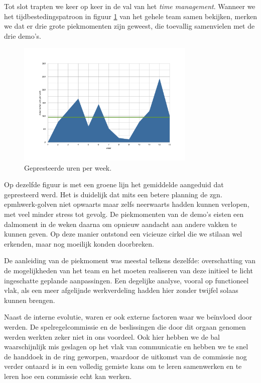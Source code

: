 \documentclass[12pt,a4paper]{report}
\begin{document}
Tot slot trapten we keer op keer in de val van het \emph{time management}. Wanneer we het tijdbestedingspatroon in figuur \ref{fig:effort} van het gehele team samen bekijken, merken we dat er drie grote piekmomenten zijn geweest, die toevallig samenvielen met de drie demo's. 

\begin{figure}[htbp]
  \centering
  \includegraphics[width=85mm]{resources/effort.pdf}
  \caption{Gepresteerde uren per week.}
  \label{fig:effort}
\end{figure}

Op dezelfde figuur is met een groene lijn het gemiddelde aangeduid dat gepresteerd werd. Het is duidelijk dat mits een betere planning de zgn.\\epmh{werk-golven} niet opwaarts maar zelfs neerwaarts hadden kunnen verlopen, met veel minder stress tot gevolg. De piekmomenten van de demo's eisten een dalmoment in de weken daarna om opnieuw aandacht aan andere vakken te kunnen geven. Op deze manier ontstond een vicieuze cirkel die we stilaan wel erkenden, maar nog moeilijk konden doorbreken.

De aanleiding van de piekmoment was meestal telkens dezelfde: overschatting van de mogelijkheden van het team en het moeten realiseren van deze initieel te licht ingeschatte geplande aanpassingen. Een degelijke analyse, vooral op functioneel vlak, als een meer afgelijnde werkverdeling hadden hier zonder twijfel solaas kunnen brengen.

Naast de interne evolutie, waren er ook externe factoren waar we be\"invloed door werden. De spelregelcommissie en de beslissingen die door dit orgaan genomen werden werkten zeker niet in ons voordeel. Ook hier hebben we de bal waarschijnlijk mis geslagen op het vlak van communicatie en hebben we te snel de handdoek in de ring geworpen, waardoor de uitkomst van de commissie nog verder ontaard is in een volledig gemiste kans om te leren samenwerken en te leren hoe een commissie echt kan werken.
\end{document}

